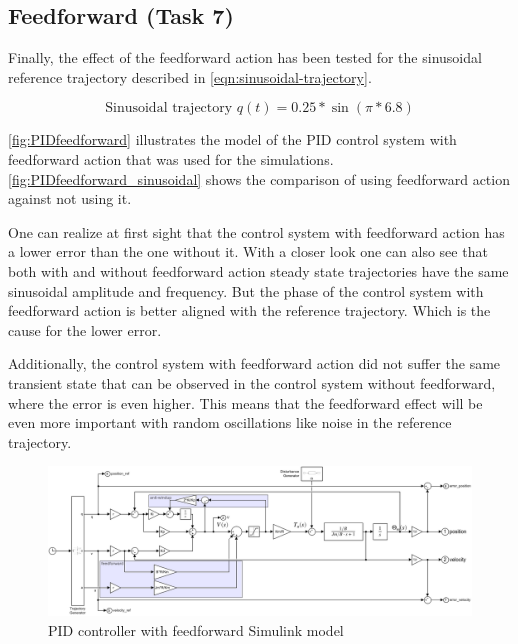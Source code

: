 \clearpage
\subsection{Feedforward (Task 7)}
Finally, the effect of the feedforward action has been tested for the
sinusoidal reference trajectory described in
\autoref{eqn:sinusoidal-trajectory}. 

\begin{equation}
    \text{Sinusoidal trajectory } q(t) = 0.25*\sin\left(\pi*6.8\right)
    \label{eqn:sinusoidal-trajectory}
\end{equation}

\autoref{fig:PIDfeedforward} illustrates the model of the PID control system
with feedforward action that was used for the simulations.
\autoref{fig:PIDfeedforward_sinusoidal} shows the comparison of using
feedforward action against not using it.

One can realize at first sight that the control system with feedforward action
has a lower error than the one without it. With a closer look one can also see
that both with and without feedforward action steady state trajectories have
the same sinusoidal amplitude and frequency. But the phase of the control
system with feedforward action is better aligned with the reference trajectory.
Which is the cause for the lower error.

Additionally, the control system with feedforward action did not
suffer the same transient state that can be observed in the control system
without feedforward, where the error is even higher. This means that the
feedforward effect will be even more important with random oscillations like
noise in the reference trajectory.

\begin{figure}
    \includegraphics[width=\textwidth]{PIDfeedforward.slx.png}
    \caption{PID controller with feedforward Simulink model}
    \label{fig:PIDfeedforward}
\end{figure}

